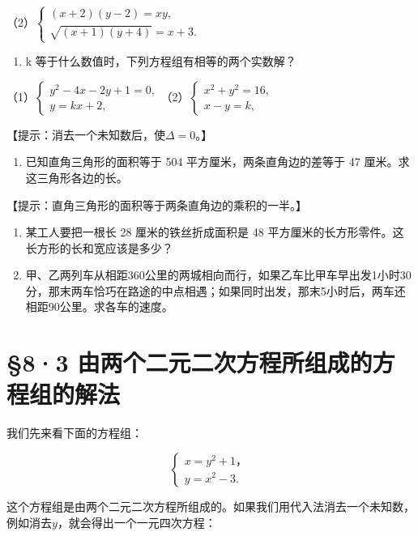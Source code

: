 （2）\(\left\{ \begin{array}{l} (x + 2)(y - 2) = xy, \\ \sqrt{(x + 1)(y + 4)} = x + 3. \end{array} \right.\)

\begin{enumerate}[start=7]
\item
  k 等于什么数值时，下列方程组有相等的两个实数解？
\end{enumerate}

（1）\(\left\{ \begin{array}{l} y^{2} - 4x - 2y + 1 = 0, \\ y = kx + 2, \end{array} \right.\)（2）\(\left\{ \begin{array}{l} x^{2} + y^{2} = 16, \\ x - y = k, \end{array} \right.\)

【提示：消去一个未知数后，使\(\Delta = 0\)。】

\begin{enumerate}[start=8]
\item
  已知直角三角形的面积等于 504 平方厘米，两条直角边的差等于 47
  厘米。求这三角形各边的长。
\end{enumerate}

【提示：直角三角形的面积等于两条直角边的乘积的一半。】

\begin{enumerate}[start=9]
\item
  某工人要把一根长 28 厘米的铁丝折成面积是 48
  平方厘米的长方形零件。这长方形的长和宽应该是多少？
\item
  甲、乙两列车从相距360公里的两城相向而行，如果乙车比甲车早出发1小时30分，那末两车恰巧在路途的中点相遇；如果同时出发，那末5小时后，两车还相距90公里。求各车的速度。
\end{enumerate}

\section{§8·3 由两个二元二次方程所组成的方程组的解法}

我们先来看下面的方程组：

\[
\left\{ \begin{array}{l} x = y ^ {2} + 1\text{，} \\ y = x ^ {2} - 3. \end{array} \right. \tag{1}
\]

这个方程组是由两个二元二次方程所组成的。如果我们用代入法消去一个未知数，例如消去\(y\)，就会得出一个一元四次方程：

